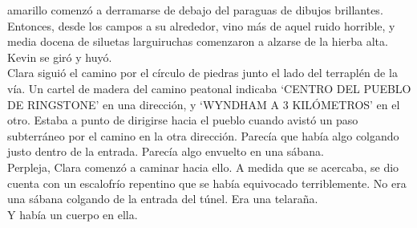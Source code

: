 amarillo comenzó a derramarse de debajo del paraguas de dibujos
brillantes. Entonces, desde los campos a su alrededor, vino más de aquel
ruido horrible, y media docena de siluetas larguiruchas comenzaron a
alzarse de la hierba alta.\\
Kevin se giró y huyó.\\[2\baselineskip]Clara siguió el camino por el
círculo de piedras junto el lado del terraplén de la vía. Un cartel de
madera del camino peatonal indicaba `CENTRO DEL PUEBLO DE RINGSTONE' en
una dirección, y `WYNDHAM A 3 KILÓMETROS' en el otro. Estaba a punto de
dirigirse hacia el pueblo cuando avistó un paso subterráneo por el
camino en la otra dirección. Parecía que había algo colgando justo
dentro de la entrada. Parecía algo envuelto en una sábana.\\
Perpleja, Clara comenzó a caminar hacia ello. A medida que se acercaba,
se dio cuenta con un escalofrío repentino que se había equivocado
terriblemente. No era una sábana colgando de la entrada del túnel. Era
una telaraña.\\
Y había un cuerpo en ella.\\
